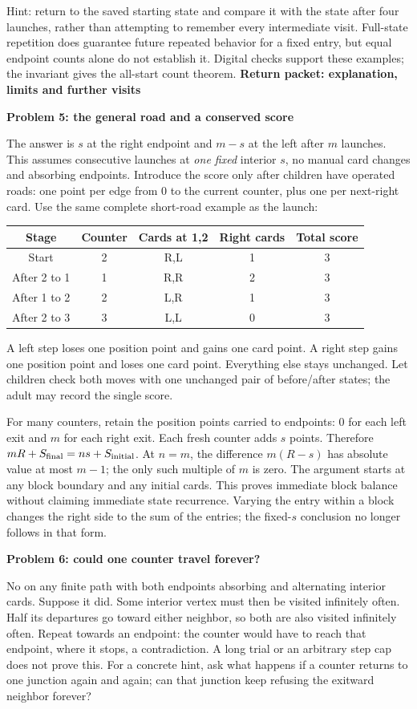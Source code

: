 \documentclass[11pt]{article}
\newcommand{\head}[1]{\vspace{3pt}\textbf{\large #1}\par}
\newcommand{\prob}[1]{\vspace{3pt}\textbf{#1}\par}
\begin{document}
Hint: return to the saved starting state and compare it with the state after four launches, rather than attempting to remember every intermediate visit. Full-state repetition does guarantee future repeated behavior for a fixed entry, but equal endpoint counts alone do not establish it. Digital checks support these examples; the invariant gives the all-start count theorem.
\newpage
\head{Return packet: explanation, limits and further visits}
\prob{Problem 5: the general road and a conserved score}
The answer is $s$ at the right endpoint and $m-s$ at the left after $m$ launches. This assumes consecutive launches at \emph{one fixed} interior $s$, no manual card changes and absorbing endpoints. Introduce the score only after children have operated roads: one point per edge from 0 to the current counter, plus one per next-right card. Use the same complete short-road example as the launch:
\begin{center}\begin{tabular}{ccccc}\toprule
Stage & Counter & Cards at 1,2 & Right cards & Total score\\\midrule
Start &2&R,L&1&3\\
After 2 to 1 &1&R,R&2&3\\
After 1 to 2 &2&L,R&1&3\\
After 2 to 3 &3&L,L&0&3\\\bottomrule\end{tabular}\end{center}
A left step loses one position point and gains one card point. A right step gains one position point and loses one card point. Everything else stays unchanged. Let children check both moves with one unchanged pair of before/after states; the adult may record the single score.

For many counters, retain the position points carried to endpoints: 0 for each left exit and $m$ for each right exit. Each fresh counter adds $s$ points. Therefore $mR+S_{\rm final}=ns+S_{\rm initial}$. At $n=m$, the difference $m(R-s)$ has absolute value at most $m-1$; the only such multiple of $m$ is zero. The argument starts at any block boundary and any initial cards. This proves immediate block balance without claiming immediate state recurrence. Varying the entry within a block changes the right side to the sum of the entries; the fixed-$s$ conclusion no longer follows in that form.

\prob{Problem 6: could one counter travel forever?}
No on any finite path with both endpoints absorbing and alternating interior cards. Suppose it did. Some interior vertex must then be visited infinitely often. Half its departures go toward either neighbor, so both are also visited infinitely often. Repeat towards an endpoint: the counter would have to reach that endpoint, where it stops, a contradiction. A long trial or an arbitrary step cap does not prove this. For a concrete hint, ask what happens if a counter returns to one junction again and again; can that junction keep refusing the exitward neighbor forever?
\end{document}
